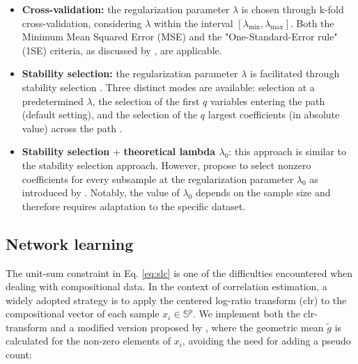 \documentclass[10pt,a4paper]{article}
\let\cite\citep
\begin{document}
\begin{itemize}
    \item \textbf{Cross-validation:} the regularization parameter $\lambda$ is chosen through k-fold cross-validation, considering $\lambda$ within the interval $[\lambda_{\text{min}}, \lambda_{\text{max}}]$. Both the Minimum Mean Squared Error (MSE) and the "One-Standard-Error rule" (1SE) criteria, as discussed by \cite{hastie2009elements}, are applicable.
    
    \item \textbf{Stability selection:} the regularization parameter $\lambda$ is facilitated through stability selection \cite{combettes2020perspective}.
    Three distinct modes are available: selection at a predetermined $\lambda$, the selection of the first $q$ variables entering the path (default setting), and the selection of the $q$ largest coefficients (in absolute value) across the path \cite{meinshausen2010stability}.
    
    \item \textbf{Stability selection }+ \textbf{theoretical lambda $\lambda_{0}$}: this approach is similar to the stability selection approach. However, \cite{combettes2020perspective} propose to select nonzero coefficients for every subsample at the regularization parameter $\lambda_{0}$ as introduced by \cite{shi2016regression}. Notably, the value of $\lambda_{0}$ depends on the sample size and therefore requires adaptation to the specific dataset.

\end{itemize}








\subsection*{Network learning}
The unit-sum constraint in Eq. \autoref{eq:slc} is one of the difficulties encountered when dealing with compositional data.  In the context of correlation estimation, a widely adopted strategy \cite{kurtz2015sparse} is to apply the centered log-ratio transform (clr) \cite{aitchison1982statistical} to the compositional vector of each sample $x_i \in \mathbb{S}^p$. We implement both the clr-transform and a modified version proposed by \cite{yoon2019microbial}, where the geometric mean $\widetilde{g}$ is calculated for the non-zero elements of \(x_i\), avoiding the need for adding a pseudo count:
\end{document}
